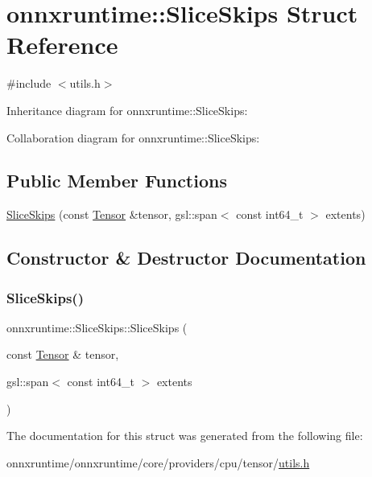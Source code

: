 \hypertarget{structonnxruntime_1_1SliceSkips}{}\section{onnxruntime\+:\+:Slice\+Skips Struct Reference}
\label{structonnxruntime_1_1SliceSkips}


{\ttfamily \#include $<$utils.\+h$>$}



Inheritance diagram for onnxruntime\+:\+:Slice\+Skips\+:


Collaboration diagram for onnxruntime\+:\+:Slice\+Skips\+:
\subsection*{Public Member Functions}
\begin{DoxyCompactItemize}
\item 
\mbox{\hyperlink{structonnxruntime_1_1SliceSkips_a0a0e0a7cb21a23fc65a5b4123fd60764}{Slice\+Skips}} (const \mbox{\hyperlink{classonnxruntime_1_1Tensor}{Tensor}} \&tensor, gsl\+::span$<$ const int64\+\_\+t $>$ extents)
\end{DoxyCompactItemize}


\subsection{Constructor \& Destructor Documentation}
\mbox{\label{structonnxruntime_1_1SliceSkips_a0a0e0a7cb21a23fc65a5b4123fd60764}} 
\subsubsection{\texorpdfstring{Slice\+Skips()}{SliceSkips()}}
{\footnotesize\ttfamily onnxruntime\+::\+Slice\+Skips\+::\+Slice\+Skips (\begin{DoxyParamCaption}\item[{const \mbox{\hyperlink{classonnxruntime_1_1Tensor}{Tensor}} \&}]{tensor,  }\item[{gsl\+::span$<$ const int64\+\_\+t $>$}]{extents }\end{DoxyParamCaption})\hspace{0.3cm}{\ttfamily [inline]}}



The documentation for this struct was generated from the following file\+:\begin{DoxyCompactItemize}
\item 
onnxruntime/onnxruntime/core/providers/cpu/tensor/\mbox{\hyperlink{providers_2cpu_2tensor_2utils_8h}{utils.\+h}}\end{DoxyCompactItemize}
